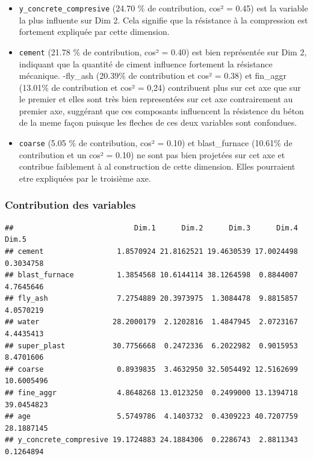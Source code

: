 \documentclass[
  12pt,
]{article}
\newenvironment{Shaded}{\begin{snugshade}}{\end{snugshade}}
\newcommand{\AttributeTok}[1]{\textcolor[rgb]{0.13,0.29,0.53}{#1}}
\newcommand{\CommentTok}[1]{\textcolor[rgb]{0.56,0.35,0.01}{\textit{#1}}}
\newcommand{\FloatTok}[1]{\textcolor[rgb]{0.00,0.00,0.81}{#1}}
\newcommand{\FunctionTok}[1]{\textcolor[rgb]{0.13,0.29,0.53}{\textbf{#1}}}
\newcommand{\NormalTok}[1]{#1}
\newcommand{\OtherTok}[1]{\textcolor[rgb]{0.56,0.35,0.01}{#1}}
\newcommand{\SpecialCharTok}[1]{\textcolor[rgb]{0.81,0.36,0.00}{\textbf{#1}}}
\providecommand{\tightlist}{%
  \setlength{\itemsep}{0pt}\setlength{\parskip}{0pt}}
\begin{document}
\begin{itemize}
\tightlist
\item
  \texttt{y\_concrete\_compresive} (24.70 \% de contribution, cos² =
  0.45) est la variable la plus influente sur Dim 2. Cela signifie que
  la résistance à la compression est fortement expliquée par cette
  dimension.
\item
  \texttt{cement} (21.78 \% de contribution, cos² = 0.40) est bien
  représentée sur Dim 2, indiquant que la quantité de ciment influence
  fortement la résistance mécanique. -fly\_ash (20.39\% de contribution
  et cos² = 0.38) et fin\_aggr (13.01\% de contribution et cos² = 0,24)
  contribuent plus sur cet axe que sur le premier et elles sont très
  bien representées sur cet axe contrairement au premier axe, suggérant
  que ces composants influencent la résistence du béton de la meme façon
  puisque les fleches de ces deux variables sont confondues.
\item
  \texttt{coarse} (5.05 \% de contribution, cos² = 0.10) et
  blast\_furnace (10.61\% de contribution et un cos² = 0.10) ne sont pas
  bien projetées sur cet axe et contribue faiblement à al construction
  de cette dimension. Elles pourraient etre expliquées par le troisième
  axe.
\end{itemize}

\subsubsection{Contribution des
variables}\label{contribution-des-variables}

\begin{Shaded}
\end{Shaded}

\begin{verbatim}
##                            Dim.1      Dim.2      Dim.3      Dim.4      Dim.5
## cement                 1.8570924 21.8162521 19.4630539 17.0024498  0.3034758
## blast_furnace          1.3854568 10.6144114 38.1264598  0.8844007  4.7645646
## fly_ash                7.2754889 20.3973975  1.3084478  9.8815857  4.0570219
## water                 28.2000179  2.1202816  1.4847945  2.0723167  4.4435413
## super_plast           30.7756668  0.2472336  6.2022982  0.9015953  8.4701606
## coarse                 0.8939835  3.4632950 32.5054492 12.5162699 10.6005496
## fine_aggr              4.8648268 13.0123250  0.2499000 13.1394718 39.0454823
## age                    5.5749786  4.1403732  0.4309223 40.7207759 28.1887145
## y_concrete_compresive 19.1724883 24.1884306  0.2286743  2.8811343  0.1264894
\end{verbatim}
\end{document}
